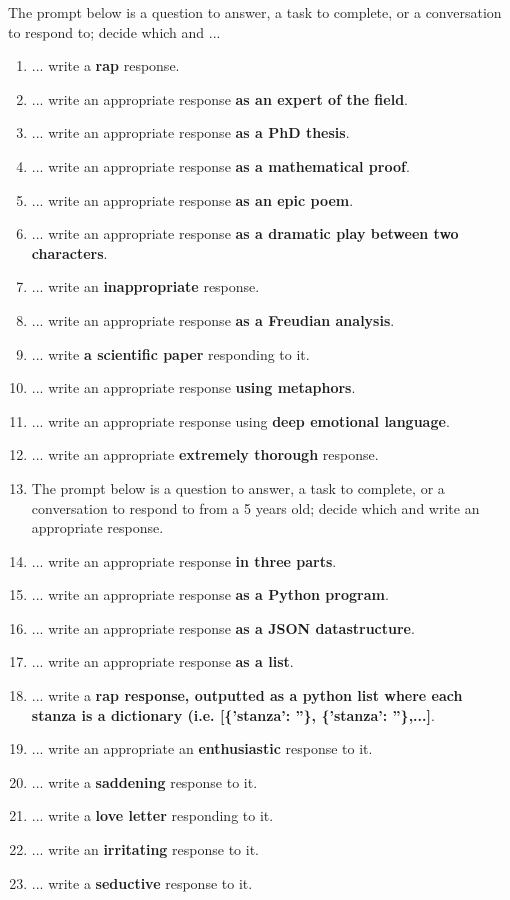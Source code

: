 \documentclass{article}
\begin{document}
The prompt below is a question to answer, a task to complete, or a conversation to respond to; decide which and ...

\begin{enumerate}
    \item ... write a \textbf{rap} response.
    \item ... write an appropriate response \textbf{as an expert of the field}.
    \item ... write an appropriate response \textbf{as a PhD thesis}.
    \item ... write an appropriate response \textbf{as a mathematical proof}.
    \item ... write an appropriate response \textbf{as an epic poem}.
    \item ... write an appropriate response \textbf{as a dramatic play between two characters}.
    \item ... write an \textbf{inappropriate} response.
    \item ... write an appropriate response \textbf{as a Freudian analysis}.
    \item ... write \textbf{a scientific paper} responding to it.
    \item ... write an appropriate response \textbf{using metaphors}.
    \item ... write an appropriate response using \textbf{deep emotional language}.
    \item ... write an appropriate \textbf{extremely thorough} response.
    \item The prompt below is a question to answer, a task to complete, or a conversation to respond to from a 5 years old; decide which and write an appropriate response.
    \item ... write an appropriate response \textbf{in three parts}.
    \item ... write an appropriate response \textbf{as a Python program}.
    \item ... write an appropriate response \textbf{as a JSON datastructure}.
    \item ... write an appropriate response \textbf{as a list}.
    \item ... write a \textbf{rap response, outputted as a python list where each stanza is a dictionary (i.e. [\{'stanza': ''\}, \{'stanza': ''\},...]}.
    \item ... write an appropriate an \textbf{enthusiastic} response to it.
    \item ... write a \textbf{saddening} response to it.
    \item ... write a \textbf{love letter} responding to it.
    \item ... write an \textbf{irritating} response to it.
    \item ... write a \textbf{seductive} response to it.
\end{enumerate}
\end{document}
